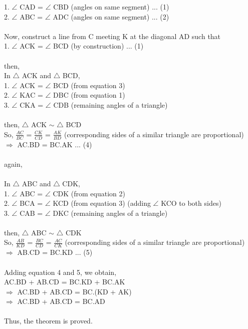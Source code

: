 \documentclass[a4paper,14pt]{extarticle}
\begin{document}
    1. $\angle$ CAD = $\angle$ CBD (angles on same segment) ... (1) \\
    2. $\angle$ ABC = $\angle$ ADC (angles on same segment) ... (2) \\ \\
    \textsf{Now, construct a line from C meeting K at the diagonal AD such that} \\ 
    1. $\angle$ ACK = $\angle$ BCD (by construction) ... (1) \\ \\
    \textsf{then, } \\  
    In $\triangle$ ACK and $\triangle$ BCD, \\
    1. $\angle$ ACK = $\angle$ BCD (from equation 3) \\
    2. $\angle$ KAC = $\angle$ DBC (from equation 1) \\
    3. $\angle$ CKA = $\angle$ CDB (remaining angles of a triangle) \\ \\
    \textsf{then, } 
    $\triangle$ ACK $\sim$ $\triangle$ BCD \\
    \textsf{So, } 
    $\frac{AC}{BC}$ = $\frac{CK}{CD}$ = $\frac{AK}{BD}$ \textsf{(corresponding sides of a similar triangle are proportional)} \\
    $\Rightarrow$ AC.BD = BC.AK ... (4) \\ \\
    \textsf{again, }\\ \\
    In $\triangle$ ABC and $\triangle$ CDK, \\
    1. $\angle$ ABC = $\angle$ CDK (from equation 2) \\
    2. $\angle$ BCA = $\angle$ KCD (from equation 3) (adding $\angle$ KCO to both sides) \\
    3. $\angle$ CAB = $\angle$ DKC (remaining angles of a triangle) \\ \\
    \textsf{then, } 
    $\triangle$ ABC $\sim$ $\triangle$ CDK \\
    \textsf{So, } 
    $\frac{AB}{KD}$ = $\frac{BC}{CD}$ = $\frac{AC}{CK}$ \textsf{(corresponding sides of a similar triangle are proportional)} \\
    $\Rightarrow$ AB.CD = BC.KD ... (5) \\ \\
    \textsf{Adding equation 4 and 5, we obtain, \\}
    AC.BD + AB.CD = BC.KD + BC.AK \\
    $\Rightarrow$ AC.BD + AB.CD = BC.(KD + AK) \\
    $\Rightarrow$ AC.BD + AB.CD = BC.AD \\ \\
    \textsf{Thus, the theorem is proved. }
\end{document}
